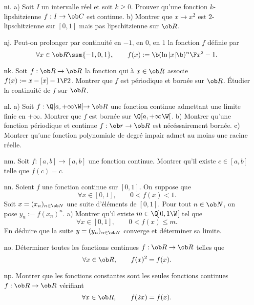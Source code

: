 \exo [Level=1,Fight=1,Learn=1,Type=\Exercices,Field=\Continuité,Origin=] ni. 
a) Soit $I$ un intervalle réel et  soit $k\ge0$. Prouver qu'une fonction $k$-lipshitzienne $f:I\to\ob C$ est continue. \pn
b) Montrer que $x\mapsto x^2$ est $2$-lipschitzienne sur $[0,1]$ mais pas lipschitzienne sur $\ob R$. 

\exo [Level=1,Fight=1,Learn=1,Type=\Exercices,Field=\Continuité,Origin=] nj. 
Peut-on prolonger par continuité en $-1$, en $0$, en $1$ la fonction $f$ définie par 
$$
\forall x\in\ob R\ssm\{-1,0,1\}, \qquad f(x):={\b(\ln|x|\b)^n\F x^2-1}.
$$

\exo [Level=1,Fight=1,Learn=1,Type=\Exercices,Field=\Continuité,Origin=] nk. 
Soit $f:\ob R\to\ob R$ la fonction qui à $x\in\ob R$ associe $f(x):=x-[x]-{1\F 2}$. Montrer que $f$ est périodique et bornée sur $\ob R$. Étudier la continuité de $f$ sur $\ob R$. 

\exo [Level=1,Fight=1,Learn=1,Type=\Exercices,Field=\Continuité,Origin=] nl. 
a) Soit $f:\Q[a,+\infty\W[\to\ob R$ une fonction continue admettant une limite finie en $+\infty$. \pn Montrer que $f$ est bornée sur $\Q[a,+\infty\W[$. \pn
b) Montrer qu'une fonction périodique et continue $f:\ob r\to\ob R$ est nécéssairement bornée. \pn
c) Montrer qu'une fonction polynomiale de degré impair admet au moins une racine réelle. 

\exo [Level=1,Fight=1,Learn=2,Type=\Exercices,Field=\Continuité,Origin=,Indication={On pourra utiliser la fonction $\varphi$ définie sur $[a,b]$ par $\varphi(x):=f(x)-x$.}] nm. 
Soit $f:[a,b]\to[a,b]$ une fonction continue. Montrer qu'il existe $c\in[a,b]$ telle que $f(c)=c$. 


\exo [Level=1,Fight=2,Learn=2,Type=\Exercices,Field=\Continuité,Origin=] nn. 
Soient $f$ une fonction continue sur $[0,1]$. On suppose que 
$$
\forall x\in[0,1], \qquad 0<f(x)<1. 
$$  
Soit $x=(x_n)_{n\in\ob N}$ une suite d'éléments de $[0,1]$. Pour tout $n\in\ob N$, on pose $y_n:=f(x_n)^n$. \pn 
a) Montrer qu'il existe $m\in\Q]0,1\W[$ tel que 
$$
\forall x\in[0,1], \qquad 0<f(x) \le m.  
$$
En déduire que la suite $y=(y_n)_{n\in\ob N}$ converge et déterminer sa limite. 

\exo [Level=1,Fight=1,Learn=2,Type=\Colles,Field=\Continuité,Origin=] no. 
Déterminer toutes les fonctions continues $f:\ob R\to\ob R$ telles que 
$$
\forall x\in\ob R, \qquad f(x)^2=f(x). 
$$

\exo [Level=1,Fight=2,Learn=2,Type=\Colles,Field=\Continuité,Origin=] np. 
Montrer que les fonctions constantes sont les seules fonctions continues $f:\ob R\to\ob R$ vérifiant 
$$
\forall x\in\ob R, \qquad f(2x)=f(x). 
$$

